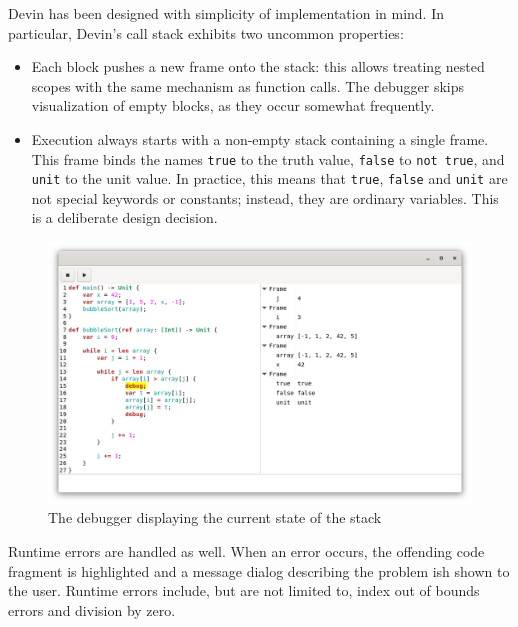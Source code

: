 \documentclass[11pt, american, draft]{PhdThesis}
\begin{document}
  Devin has been designed with simplicity of implementation in mind. In particular, Devin's call
  stack exhibits two uncommon properties:

  \begin{itemize}
    \item Each block pushes a new frame onto the stack: this allows treating nested scopes with the
          same mechanism as function calls. The debugger skips visualization of empty blocks, as
          they occur somewhat frequently.

    \item Execution always starts with a non-empty stack containing a single frame. This frame binds
          the names \verb$true$ to the truth value, \verb$false$ to \verb$not true$, and \verb$unit$
          to the unit value. In practice, this means that \verb$true$, \verb$false$ and \verb$unit$
          are not special keywords or constants; instead, they are ordinary variables. This is a
          deliberate design decision.
  \end{itemize}

  \begin{figure}[H]
    \center
    \includegraphics[width=0.9\linewidth]{5.png}
    \caption{The debugger displaying the current state of the stack}
  \end{figure}

  Runtime errors are handled as well. When an error occurs, the offending code fragment is
  highlighted and a message dialog describing the problem ish shown to the user. Runtime errors
  include, but are not limited to, index out of bounds errors and division by zero.
\end{document}
